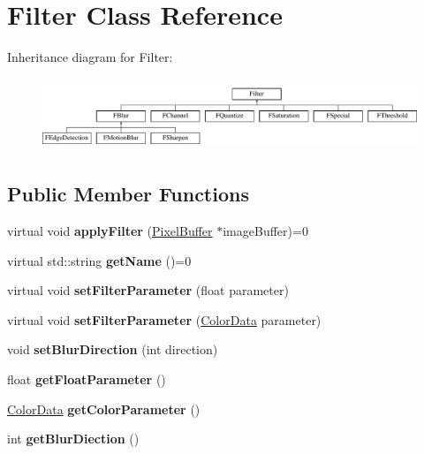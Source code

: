 \hypertarget{classFilter}{\section{Filter Class Reference}
\label{classFilter}
}
Inheritance diagram for Filter\-:\begin{figure}[H]
\begin{center}
\leavevmode
\includegraphics[height=2.181818cm]{classFilter}
\end{center}
\end{figure}
\subsection*{Public Member Functions}
\begin{DoxyCompactItemize}
\item 
\hypertarget{classFilter_a2ecb4bc0e81851d30f46f30bf81d1739}{virtual void {\bfseries apply\-Filter} (\hyperlink{classPixelBuffer}{Pixel\-Buffer} $\ast$image\-Buffer)=0}\label{classFilter_a2ecb4bc0e81851d30f46f30bf81d1739}

\item 
\hypertarget{classFilter_a212f40acb6481b2e36c3d129007519f1}{virtual std\-::string {\bfseries get\-Name} ()=0}\label{classFilter_a212f40acb6481b2e36c3d129007519f1}

\item 
\hypertarget{classFilter_aba015e9da647ba41fee4b41019d54516}{virtual void {\bfseries set\-Filter\-Parameter} (float parameter)}\label{classFilter_aba015e9da647ba41fee4b41019d54516}

\item 
\hypertarget{classFilter_a88314088e678c9a7cdbe0d0557385fa8}{virtual void {\bfseries set\-Filter\-Parameter} (\hyperlink{classColorData}{Color\-Data} parameter)}\label{classFilter_a88314088e678c9a7cdbe0d0557385fa8}

\item 
\hypertarget{classFilter_ada9d5f112e217c9bcf413093eae2a1e9}{void {\bfseries set\-Blur\-Direction} (int direction)}\label{classFilter_ada9d5f112e217c9bcf413093eae2a1e9}

\item 
\hypertarget{classFilter_a9f741b045bf1d57e485f116ce62ebac1}{float {\bfseries get\-Float\-Parameter} ()}\label{classFilter_a9f741b045bf1d57e485f116ce62ebac1}

\item 
\hypertarget{classFilter_abf85cdf0cda6dbe1dbcd6b8813aeecf3}{\hyperlink{classColorData}{Color\-Data} {\bfseries get\-Color\-Parameter} ()}\label{classFilter_abf85cdf0cda6dbe1dbcd6b8813aeecf3}

\item 
\hypertarget{classFilter_a465a168fc580c773e58d4df2f3db5968}{int {\bfseries get\-Blur\-Diection} ()}\label{classFilter_a465a168fc580c773e58d4df2f3db5968}

\end{DoxyCompactItemize}
